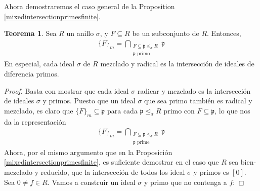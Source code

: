 \documentclass[12pt,a4paper,BCOR15mm,twoside,DIV12]{article}
\def\p{\mathfrak{p}}
\def\s{\sigma}
\def\si{\unlhd_{\sigma}}
\newenvironment{bew}{\begin{proof}[Proof]}{\end{proof}}
\theoremstyle{definition}
\newtheorem{theorem}[Satz]{Teorema}
\begin{document}
Ahora demostraremos el caso general de la Proposition \ref{mixedintersectionprimesfinite}. 


\begin{theorem}\label{intersectionprimes}
Sea $R$ un anillo $\s$, y $F \subseteq R$ be un subconjunto de $R$. Entonces, 
\begin{align*} \{F\}_m = \bigcap_{\substack{F \subseteq \p \si R \\ \p \text{ primo}}} \p \end{align*}
En especial, cada ideal $\s$ de $R$ mezclado y radical es la intersección de ideales de diferencia primos.
\begin{bew}
Basta con mostrar que cada ideal $\s$ radicar y mezclado es la intersección de ideales $\s$ y primos. Puesto que un ideal $\s$ que sea primo también es radical y mezclado,
es claro que $\{F\}_m \subseteq \p$ para cada $\p \si R$ primo con $F \subseteq \p$, lo que nos da la representación
\begin{align*} \{F\}_m = \bigcap_{\substack{F \subseteq \p \si R \\ \p \text{ prime}}} \p \end{align*}
Ahora, por el mismo argumento que en la Proposición \ref{mixedintersectionprimesfinite}, es suficiente demostrar en el caso que $R$ sea bien-mezclado y reducido, que la intersección de todos los ideal $\s$ y primos es $[0]$.
Sea $0 \neq f \in R$. Vamos a construir un ideal $\s$ y primo que no contenga a $f$: 


\end{bew}
\end{theorem}
\end{document}
